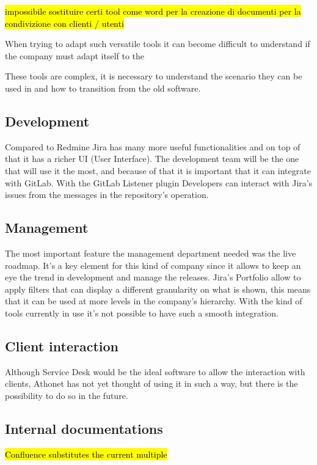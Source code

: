 	\hl{impossibile sostituire certi tool come word per la creazione di documenti per la condivizione con clienti / utenti}

	When trying to adapt such versatile tools it can become difficult to understand if the company must adapt itself to the 
	
	These tools are complex, it is necessary to understand the scenario they can be used in and how to transition from the old software.

	\subsection{Development} 
		Compared to Redmine Jira has many more useful functionalities and on top of that it has a richer UI (User Interface).
		The development team will be the one that will use it the most, and because of that it is important that it can integrate with GitLab.
		With the GitLab Listener plugin Developers can interact with Jira's issues from the messages in the repository's operation.
	
	\subsection{Management} 
		The most important feature the management department needed was the live roadmap.	
		It's a key element for this kind of company since it allows to keep an eye the trend in development and manage the releases.
		Jira's Portfolio allow to apply filters that can display a different granularity on what is shown, this means that it can be used at more levels in the company's hierarchy.
		With the kind of tools currently in use it's not possible to have such a smooth integration.
	
	\subsection{Client interaction} 
		Although Service Desk would be the ideal software to allow the interaction with clients, Athonet has not yet thought of using it in such a way, but there is the possibility to do so in the future.
		
	\subsection{Internal documentations}
		\hl{Confluence substitutes the current multiple }
		
